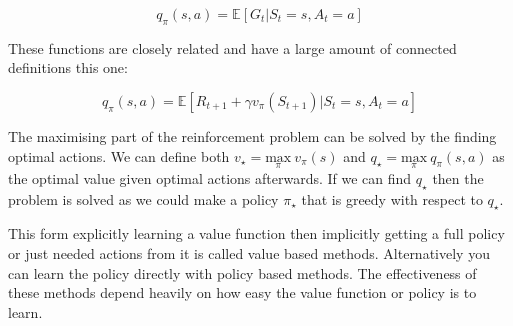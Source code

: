 $$
q_{\pi}(s,a) = \mathbb{E}\left[ G_{t} | S_{t}=s, A_{t}=a \right] 
$$

These functions are closely related and have a large amount of connected definitions this one:

$$
q_{\pi}(s,a)=\mathbb{E}\left[ R_{t+1}+\gamma v_{\pi}(S_{t+1})|S_{t}=s, A_{t}=a \right] 
$$

The maximising part of the reinforcement problem can be solved by the finding optimal actions. We can define both $v_{\star}=\underset{ \pi }{ \text{max} }\ v_{\pi}(s)$ and $q_{\star}=\underset{ \pi }{ \text{max} }\ q_{\pi}(s,a)$ as the optimal value given optimal actions afterwards.
If we can find $q_{\star}$ then the problem is solved as we could make a policy $\pi_{\star}$ that is greedy with respect to $q_{\star}$. 

This form explicitly learning a value function then implicitly getting a full policy or just needed actions from it is called value based methods. Alternatively you can learn the policy directly with policy based methods. The effectiveness of these methods depend heavily on how easy the value function or policy is to learn.